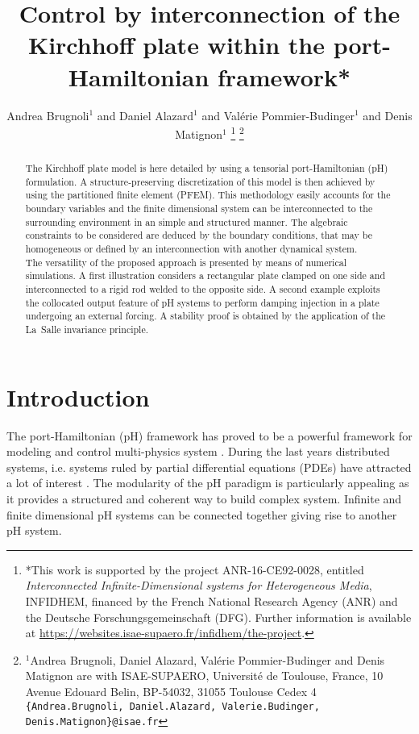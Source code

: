 \documentclass[letterpaper, 10 pt, conference]{ieeeconf}
\title{\LARGE \bf
	Control by interconnection of the Kirchhoff plate
	within the port-Hamiltonian framework*	
}
\author{Andrea Brugnoli$^{1}$ and Daniel Alazard$^{1}$ and Val\'erie Pommier-Budinger$^{1}$ and Denis Matignon$^{1}$%
	\thanks{*This work is supported by the project ANR-16-CE92-0028,
		entitled {\em Interconnected Infinite-Dimensional systems for Heterogeneous
			Media}, INFIDHEM, financed by the French National Research Agency (ANR) and the Deutsche Forschungsgemeinschaft (DFG). Further information is available at { \url{https://websites.isae-supaero.fr/infidhem/the-project}}.}%
	\thanks{$^{1}$Andrea Brugnoli, Daniel Alazard, Val\'erie Pommier-Budinger and Denis Matignon are with ISAE-SUPAERO, Universit\'e de Toulouse, France,
		10 Avenue Edouard Belin, BP-54032, 31055 Toulouse Cedex 4
		{\tt\small \{Andrea.Brugnoli, Daniel.Alazard, Valerie.Budinger, Denis.Matignon\}@isae.fr} }
}
\begin{document}
\maketitle
\thispagestyle{empty}
\pagestyle{empty}

\maketitle

\begin{abstract}
	The Kirchhoff plate model is here detailed by using a tensorial port-Hamiltonian (pH) formulation. A structure-preserving discretization of this model is then achieved by using the partitioned finite element (PFEM). This methodology easily accounts for the boundary variables and the finite dimensional system can be interconnected to the surrounding environment in an simple and structured manner. The algebraic constraints to be considered are deduced by the boundary conditions, that may be homogeneous or defined by an interconnection with another dynamical system. \\
	The versatility of the proposed approach is presented by means of numerical simulations. A first illustration considers a rectangular plate clamped on one side and interconnected to a rigid rod welded to the opposite side. A second example exploits the collocated output feature of pH systems to perform damping injection in a plate undergoing an external forcing. A stability proof is obtained by the application of the La~Salle invariance principle.
\end{abstract}





%
\IEEEpeerreviewmaketitle



\section{Introduction}
The port-Hamiltonian (pH) framework has proved to be a powerful framework for modeling and control multi-physics system \cite{bookPHs}. During the last years distributed systems, i.e. systems ruled by partial differential equations (PDEs) have attracted a lot of interest \cite{BookZwart}. The modularity of the pH paradigm is particularly appealing as it provides a structured and coherent way to build complex system. Infinite \cite{ShaftIntInfinite} and finite \cite{CerveraIntFinite} dimensional pH systems can be connected together giving rise to another pH system. \\
\end{document}
